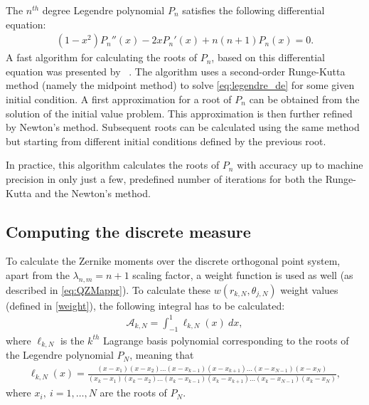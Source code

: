 The $n^{th}$ degree Legendre polynomial $P_n$ satisfies the following differential equation:
\begin{gather}
    (1-x^2)P_n''(x) - 2xP_n'(x) + n(n+1)P_n(x) = 0.\label{eq:legendre_de}
\end{gather}
A fast algorithm for calculating the roots of $P_n$, based on this differential equation was presented by \citeauthor{legendre_algo}~\cite{legendre_algo}. The algorithm uses a second-order Runge-Kutta method (namely the midpoint method) to solve \eqref{eq:legendre_de} for some given initial condition. A first approximation for a root of $P_n$ can be obtained from the solution of the initial value problem. This approximation is then further refined by Newton's method.
Subsequent roots can be calculated using the same method but starting from different initial conditions defined by the previous root.

In practice, this algorithm calculates the roots of $P_n$ with accuracy up to machine precision in only just a few, predefined number of iterations for both the Runge-Kutta and the Newton's method.

\subsection{Computing the discrete measure}
To calculate the Zernike moments over the discrete orthogonal point system, apart from the $\lambda_{n,m} = n + 1$ scaling factor, a weight function is used as well (as described in \eqref{eq:QZMappr}). To calculate these $w(r_{k,N},\theta_{j,N})$ weight values (defined in \eqref{weight}), the following integral has to be calculated:
\begin{gather*}
    \mathcal{A}_{k,N} = \int_{-1}^{1}\ell_{k,N}(x)\ dx,
\end{gather*}
where $\ell_{k,N}$ is the $k^{th}$ Lagrange basis polynomial corresponding to the roots of the Legendre polynomial $P_N$, meaning that
\begin{gather*}
    \ell_{k,N}(x) = \frac{(x - x_1)(x - x_2)\ldots(x - x_{k-1})(x - x_{k+1})\ldots(x - x_{N-1})(x - x_N)}{(x_k - x_1)(x_k - x_2)\ldots(x_k - x_{k-1})(x_k - x_{k+1})\ldots(x_k - x_{N-1})(x_k - x_N)},
\end{gather*}
where $x_i, \ i = 1,\ldots,N$ are the roots of $P_N$.

